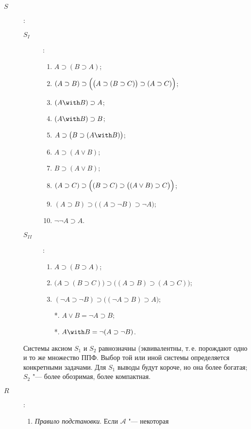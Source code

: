 \begin{description}
\item[$S$]:
  \begin{description}
  \item[$S_{I}$]:
    \begin{enumerate}
    \item $A\supset \left(B\supset A\right)$;
    \item $\left(A\supset
B\right)\supset\Bigl(\bigl(A\supset\left(B\supset
C\right)\bigr)\supset\left(A\supset C\right)\Bigr)$;
    \item $(A\with B)\supset A$;
    \item $(A\with B)\supset B$;
    \item $A\supset\bigl(B\supset (A\with B)\bigr)$;
    \item $A\supset(A \lor B)$;
    \item $B\supset(A \lor B)$;
    \item $\left(A\supset C\right)\supset\Bigl(\left(B\supset
C\right)\supset\bigl(\left(A\lor B\right)\supset C\bigr)\Bigr)$;
    \item $\left(A\supset B\right)\supset\bigl(\left(A\supset\lnot
B\right)\supset\lnot A\bigr)$;
    \item $\lnot\lnot A\supset A$.
    \end{enumerate}
  \item[$S_{II}$]:
    \begin{enumerate}
    \item $A\supset(B\supset A)$;
    \item $\bigl(A\supset\left(B\supset
C\right)\bigr)\supset\bigl(\left(A\supset
B\right)\supset\left(A\supset C\right)\bigr)$;
    \item $\left(\lnot A\supset\lnot B\right)\supset \bigl(\left(\lnot
A\supset B\right)\supset A\bigr)$;
    \item[*.] $A\lor B=\lnot A\supset B$;
    \item[*.] $A\with B=\lnot(A\supset\lnot B)$.
    \end{enumerate}
  \end{description}
  \begin{rem} Системы аксиом $S_1$ и $S_2$ равнозначны (эквивалентны,
т.\,е. порождают одно и то же множество ППФ. Выбор той или иной
системы определяется конкретными задачами. Для $S_1$ выводы будут
короче, но она более богатая; $S_2$ "--- более обозримая, более
компактная.
  \end{rem}
\item[$R$]:
  \begin{enumerate}
  \item \emph{Правило подстановки}. Если $\mathcal A$ "--- некоторая

\end{enumerate}
\end{description}
